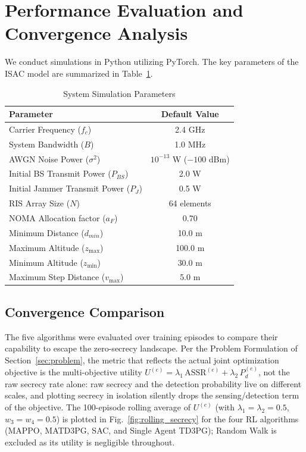 \documentclass[journal,onecolumn]{IEEEtran}
\begin{document}
\section{Performance Evaluation and Convergence Analysis}
\label{sec:convergence}
We conduct simulations in Python utilizing PyTorch. The key parameters of the ISAC model are summarized in Table~\ref{tab:parameters}.

\begin{table}[H]
\centering
\caption{System Simulation Parameters}
\label{tab:parameters}
\begin{tabular}{lc}
\toprule
\textbf{Parameter} & \textbf{Default Value} \\
\midrule
Carrier Frequency ($f_c$) & 2.4 GHz \\
System Bandwidth ($B$) & 1.0 MHz \\
AWGN Noise Power ($\sigma^2$) & $10^{-13}$ W ($-100$ dBm) \\
Initial BS Transmit Power ($P_{BS}$) & 2.0 W \\
Initial Jammer Transmit Power ($P_J$) & 0.5 W \\
RIS Array Size ($N$) & 64 elements \\
NOMA Allocation factor ($a_F$) & 0.70 \\
Minimum Distance ($d_{min}$) & 10.0 m \\
Maximum Altitude ($z_{\max}$) & 100.0 m \\
Minimum Altitude ($z_{\min}$) & 30.0 m \\
Maximum Step Distance ($v_{\max}$) & 5.0 m \\
\bottomrule
\end{tabular}
\end{table}

\subsection{Convergence Comparison}
The five algorithms were evaluated over training episodes to compare their capability to escape the zero-secrecy landscape. Per the Problem Formulation of Section~\ref{sec:problem}, the metric that reflects the actual joint optimization objective is the multi-objective utility $U^{(e)} = \lambda_1 \,\text{ASSR}^{(e)} + \lambda_2 \,P_d^{(e)}$, not the raw secrecy rate alone: raw secrecy and the detection probability live on different scales, and plotting secrecy in isolation silently drops the sensing/detection term of the objective. The 100-episode rolling average of $U^{(e)}$ (with $\lambda_1 = \lambda_2 = 0.5$, $w_3 = w_4 = 0.5$) is plotted in Fig.~\ref{fig:rolling_secrecy} for the four RL algorithms (MAPPO, MATD3PG, SAC, and Single Agent TD3PG); Random Walk is excluded as its utility is negligible throughout.
\end{document}
